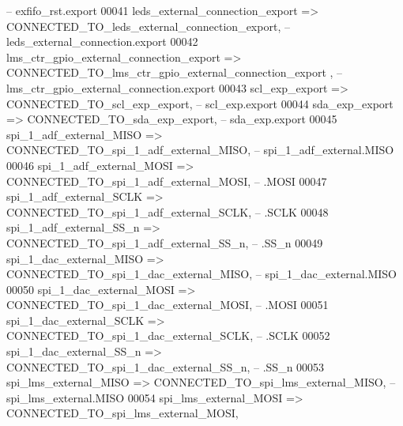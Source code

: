 \begin{DoxyCode}
{        --                       exfifo\_rst.export}
00041             leds_external_connection_export         => CONNECTED\_TO\_leds\_external\_connection\_export,\textcolor{keyword}{       
        --         leds\_external\_connection.export}
00042             lms_ctr_gpio_external_connection_export => CONNECTED\_TO\_lms\_ctr\_gpio\_external\_connection\_export
      ,\textcolor{keyword}{ -- lms\_ctr\_gpio\_external\_connection.export}
00043             scl_exp_export                          => CONNECTED\_TO\_scl\_exp\_export,\textcolor{keyword}{                        
        --                          scl\_exp.export}
00044             sda_exp_export                          => CONNECTED\_TO\_sda\_exp\_export,\textcolor{keyword}{                        
        --                          sda\_exp.export}
00045             spi_1_adf_external_MISO                 => CONNECTED\_TO\_spi\_1\_adf\_external\_MISO,\textcolor{keyword}{               
        --               spi\_1\_adf\_external.MISO}
00046             spi_1_adf_external_MOSI                 => CONNECTED\_TO\_spi\_1\_adf\_external\_MOSI,\textcolor{keyword}{               
        --                                 .MOSI}
00047             spi_1_adf_external_SCLK                 => CONNECTED\_TO\_spi\_1\_adf\_external\_SCLK,\textcolor{keyword}{               
        --                                 .SCLK}
00048             spi_1_adf_external_SS_n                 => CONNECTED\_TO\_spi\_1\_adf\_external\_SS\_n,\textcolor{keyword}{               
        --                                 .SS\_n}
00049             spi_1_dac_external_MISO                 => CONNECTED\_TO\_spi\_1\_dac\_external\_MISO,\textcolor{keyword}{               
        --               spi\_1\_dac\_external.MISO}
00050             spi_1_dac_external_MOSI                 => CONNECTED\_TO\_spi\_1\_dac\_external\_MOSI,\textcolor{keyword}{               
        --                                 .MOSI}
00051             spi_1_dac_external_SCLK                 => CONNECTED\_TO\_spi\_1\_dac\_external\_SCLK,\textcolor{keyword}{               
        --                                 .SCLK}
00052             spi_1_dac_external_SS_n                 => CONNECTED\_TO\_spi\_1\_dac\_external\_SS\_n,\textcolor{keyword}{               
        --                                 .SS\_n}
00053             spi_lms_external_MISO                   => CONNECTED\_TO\_spi\_lms\_external\_MISO,\textcolor{keyword}{                 
        --                 spi\_lms\_external.MISO}
00054             spi_lms_external_MOSI                   => CONNECTED\_TO\_spi\_lms\_external\_MOSI,\textcolor{keyword}{                 
}
\end{DoxyCode}

